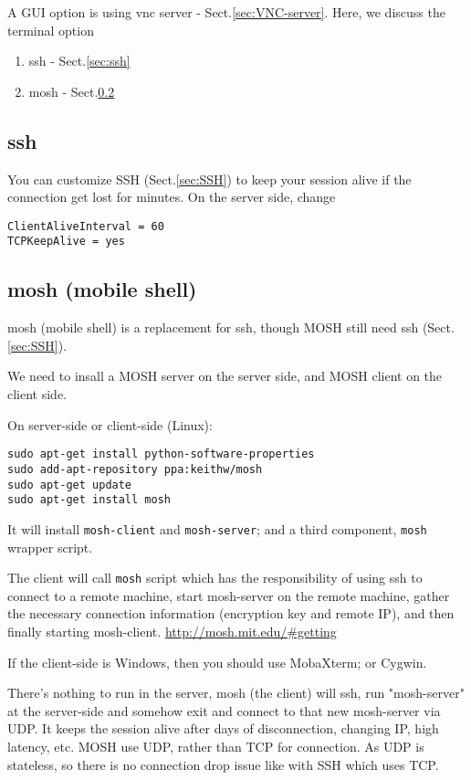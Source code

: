 A GUI option is using vnc server - Sect.\ref{sec:VNC-server}.
Here, we discuss the terminal option
\begin{enumerate}
  \item ssh - Sect.\ref{sec:ssh}
  
  \item mosh - Sect.\ref{sec:MOSH}
\end{enumerate}

\subsection{ssh}

You can customize SSH (Sect.\ref{sec:SSH}) to keep your session alive if the
connection get lost for minutes. On the server side, change
\begin{verbatim}
ClientAliveInterval = 60
TCPKeepAlive = yes
\end{verbatim}


\subsection{mosh (mobile shell)}
\label{sec:MOSH}

mosh (mobile shell) is a replacement for ssh, though MOSH still need ssh
(Sect.\ref{sec:SSH}). 

We need to insall a MOSH server on the server side, and MOSH client on the
client side. 

On server-side or client-side (Linux):
\begin{verbatim}
sudo apt-get install python-software-properties
sudo add-apt-repository ppa:keithw/mosh
sudo apt-get update
sudo apt-get install mosh
\end{verbatim}
It will install \verb!mosh-client! and \verb!mosh-server!; and a third
component, \verb!mosh! wrapper script. 

The client will call \verb!mosh! script which has the responsibility of using
ssh to connect to a remote machine, start mosh-server on the remote machine,
gather the necessary connection information (encryption key and remote IP), and
then finally starting mosh-client.
\url{http://mosh.mit.edu/#getting}

If the client-side is Windows, then you should use MobaXterm;
or Cygwin.

% 
% 
There's nothing to run in the server, mosh (the client)
will ssh, run "mosh-server" at the server-side and somehow exit and connect to
that new mosh-server via UDP. It keeps the session alive after days of
disconnection, changing IP, high latency, etc. MOSH use UDP, rather than TCP for
connection. As UDP is stateless, so there is no connection drop issue like with
SSH which uses TCP.


